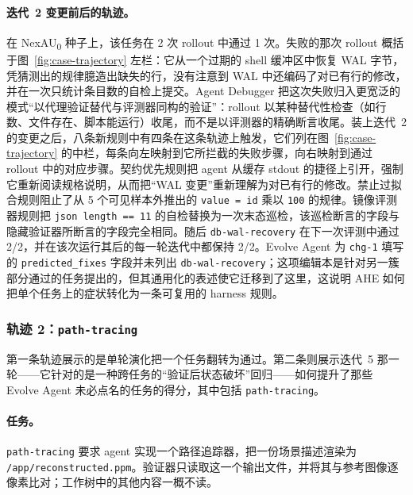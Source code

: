 \paragraph{迭代~2 变更前后的轨迹。}
在 NexAU\textsubscript{0} 种子上，该任务在 2 次 rollout 中通过 1 次。失败的那次 rollout 概括于图~\ref{fig:case-trajectory} 左栏：它从一个过期的 shell 缓冲区中恢复 WAL 字节，凭猜测出的规律臆造出缺失的行，没有注意到 WAL 中还编码了对已有行的修改，并在一次只统计条目数的自检上提交。Agent Debugger 把这次失败归入更宽泛的模式“以代理验证替代与评测器同构的验证”：rollout 以某种替代性检查（如行数、文件存在、脚本能运行）收尾，而不是以评测器的精确断言收尾。装上迭代~2 的变更之后，八条新规则中有四条在这条轨迹上触发，它们列在图~\ref{fig:case-trajectory} 的中栏，每条向左映射到它所拦截的失败步骤，向右映射到通过 rollout 中的对应步骤。契约优先规则把 agent 从缓存 stdout 的捷径上引开，强制它重新阅读规格说明，从而把“WAL 变更”重新理解为对已有行的修改。禁止过拟合规则阻止了从 5 个可见样本外推出的 \texttt{value = id} 乘以 \texttt{100} 的规律。镜像评测器规则把 \texttt{json length == 11} 的自检替换为一次末态巡检，该巡检断言的字段与隐藏验证器所断言的字段完全相同。随后 \texttt{db-wal-recovery} 在下一次评测中通过 2/2，并在该次运行其后的每一轮迭代中都保持 2/2。Evolve Agent 为 \texttt{chg-1} 填写的 \texttt{predicted\_fixes} 字段并未列出 \texttt{db-wal-recovery}；这项编辑本是针对另一簇部分通过的任务提出的，但其通用化的表述使它迁移到了这里，这说明 AHE 如何把单个任务上的症状转化为一条可复用的 harness 规则。


\FloatBarrier

\subsubsection{轨迹 2：\texttt{path-tracing}}
\label{app:case-study:pathtracing}

第一条轨迹展示的是单轮演化把一个任务翻转为通过。第二条则展示迭代~5 那一轮——它针对的是一种跨任务的“验证后状态破坏”回归——如何提升了那些 Evolve Agent 未必点名的任务的得分，其中包括 \texttt{path-tracing}。

\paragraph{任务。}
\texttt{path-tracing} 要求 agent 实现一个路径追踪器，把一份场景描述渲染为 \texttt{/app/reconstructed.ppm}。验证器只读取这一个输出文件，并将其与参考图像逐像素比对；工作树中的其他内容一概不读。

